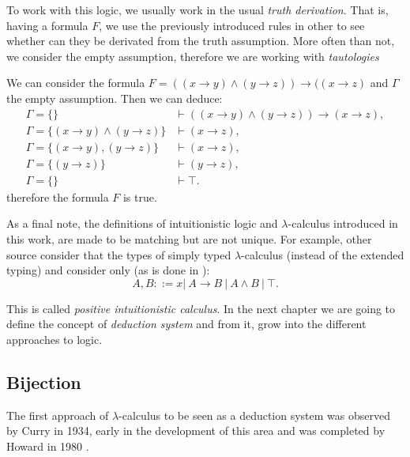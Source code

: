 To work with this logic, we usually work in the usual \emph{truth derivation}. That is, having a formula $F$, we use the previously introduced rules in other to see whether can they be derivated from the truth assumption. More often than not, we consider the empty assumption, therefore we are working with \emph{tautologies}

\begin{example}
  We can consider the formula $F=((x\to y) \land (y\to z)) \to ((x \to z)$ and $\Gamma$ the empty assumption. Then we can deduce:
  \begin{align*}
    \Gamma=\{\}& \vdash    ((x\to y) \land (y\to z)) \to (x\to z),\\
    \Gamma=\{(x\to y)\land (y\to z)\} & \vdash    (x \to z),\\
    \Gamma=\{(x\to y), (y\to z)\} & \vdash    (x \to z),\\
    \Gamma=\{ (y\to z)\} & \vdash    (y \to z),\\
    \Gamma=\{\} & \vdash \top.
    \end{align*}
therefore the formula $F$ is true.
\end{example}





As a final note, the definitions of intuitionistic logic and $\lambda$-calculus introduced in this work, are made to be matching but are not unique. For example, other source consider that the types of simply typed $\lambda$-calculus (instead of the extended typing) and consider only (as is done in \cite[Section 6.5]{selinger2008lecture}):
$$A,B ::= x |\ A\to B\ |\ A \land B \ |\ \top .$$

This is called \emph{positive intuitionistic calculus}. In the next chapter we are going to define the concept of \emph{deduction system} and from it, grow into the different approaches to logic.



\subsection{Bijection}
The first approach of $\lambda$-calculus to be seen as a deduction system was observed by Curry in 1934\cite{curry1934functionality}, early in the development of this area and was completed by Howard in 1980 \cite{howard1980formulae}. \\%


